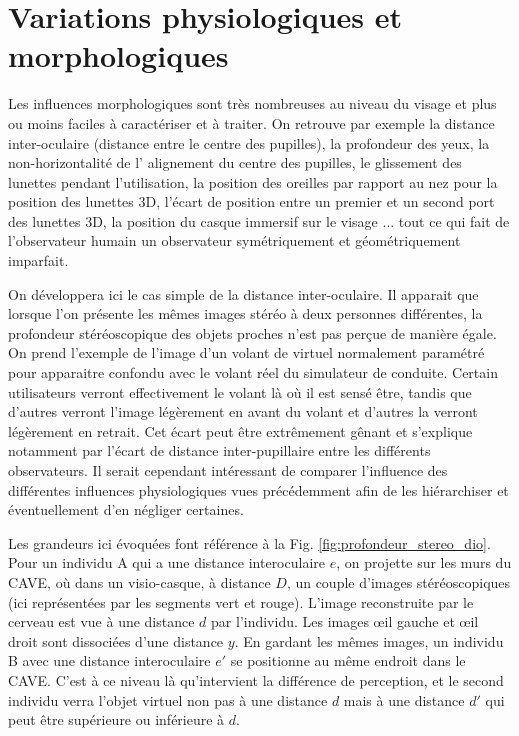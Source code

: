 	\section{Variations physiologiques et morphologiques}
	\par Les influences morphologiques sont très nombreuses au niveau du visage et plus ou moins faciles à caractériser et à traiter. On retrouve par exemple la distance inter-oculaire (distance entre le centre des pupilles), la profondeur des yeux, la non-horizontalité de l' alignement du centre des pupilles, le glissement des lunettes pendant l'utilisation, la position des oreilles par rapport au nez pour la position des lunettes 3D, l'écart de position entre un premier et un second port des lunettes 3D, la position du casque immersif sur le visage ... tout ce qui fait de l'observateur humain un observateur symétriquement et géométriquement imparfait.
	
	\par On développera ici le cas simple de la distance inter-oculaire. Il apparait que lorsque l'on présente les mêmes images stéréo à deux personnes différentes, la profondeur stéréoscopique des objets proches n'est pas perçue de manière égale. On prend l'exemple de l'image d'un volant de virtuel normalement paramétré pour apparaitre confondu avec le volant réel du simulateur de conduite. Certain utilisateurs verront effectivement le volant là où il est sensé être, tandis que d'autres verront l'image légèrement en avant du volant et d'autres la verront légèrement en retrait. Cet écart peut être extrêmement gênant et s'explique notamment par l'écart de distance inter-pupillaire entre les différents observateurs. Il serait cependant intéressant de comparer l'influence des différentes influences physiologiques vues précédemment afin de les hiérarchiser et éventuellement d'en négliger certaines.
	
	\par Les grandeurs ici évoquées font référence à la Fig. \ref{fig:profondeur_stereo_dio}. Pour un individu A qui a une distance interoculaire $e$, on projette sur les murs du CAVE, où dans un visio-casque, à distance $D$, un couple d'images stéréoscopiques (ici représentées par les segments vert et rouge). L'image reconstruite par le cerveau est vue à une distance $d$ par l'individu. Les images œil gauche et œil droit sont dissociées d'une distance $y$. En gardant les mêmes images, un individu B avec une distance interoculaire $e\prime$ se positionne au même endroit dans le CAVE. C'est à ce niveau là qu'intervient la différence de perception, et le second individu verra l'objet virtuel non pas à une distance $d$ mais à une distance $d\prime$ qui peut être supérieure ou inférieure à $d$.

